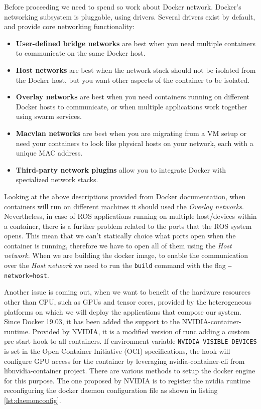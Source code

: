 Before proceeding we need to spend so work about Docker network. Docker’s networking subsystem is pluggable, using drivers. Several drivers exist by default, and provide core networking functionality:
\begin{itemize}
	\item \textbf{User-defined bridge networks} are best when you need multiple containers to communicate on the same Docker host.
	\item \textbf{Host networks} are best when the network stack should not be isolated from the Docker host, but you want other aspects of the container to be isolated.
	\item \textbf{Overlay networks} are best when you need containers running on different Docker hosts to communicate, or when multiple applications work together using swarm services.
	\item \textbf{Macvlan networks} are best when you are migrating from a VM setup or need your containers to look like physical hosts on your network, each with a unique MAC address.
	\item \textbf{Third-party network plugins} allow you to integrate Docker with specialized network stacks.
\end{itemize}
Looking at the above descriptions provided from Docker documentation, when containers will run on different machines it should used the \textit{Overlay networks}. Nevertheless, in case of ROS applications running on multiple host/devices within a container, there is a further problem related to the ports that the ROS system opens. This mean that we can't statically choice what ports open when the container is running, therefore we have to open all of them using the \textit{Host network}.
When we are building the docker image, to enable the communication over the \textit{Host network} we need to run the \texttt{build} command with the flag \texttt{--network=host}.



Another issue is coming out, when we want to benefit of the hardware resources other than CPU, such as GPUs and tensor cores, provided by the heterogeneous platforms on which we will deploy the applications that compose our system.
Since Docker 19.03, it has been added the support to the NVIDIA-container-runtime. Provided by NVIDIA, it is a modified version of runc adding a custom pre-start hook to all containers.
If environment variable \texttt{NVIDIA_VISIBLE_DEVICES} is set in the Open Container Initiative (OCI) specifications, the hook will configure GPU access for the container by leveraging nvidia-container-cli from libnvidia-container project.
There are various methods to setup the docker engine for this purpose. The one proposed by NVIDIA is to register the nvidia runtime reconfiguring the docker daemon configuration file as shown in listing \ref{lst:daemonconfig}.

